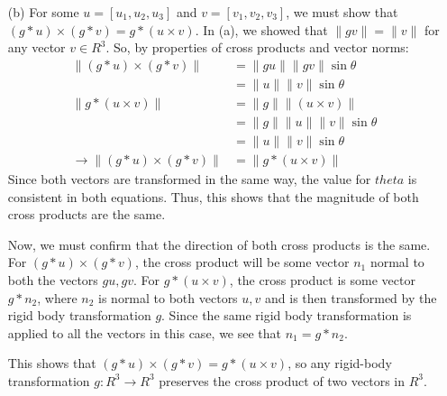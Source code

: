 \documentclass[12pt]{article}
\begin{document}
\begin{enumerate}
	\item[(b)] For some  $u = [u_1, u_2, u_3]$ and $v = [v_1, v_2, v_3]$, we must show that $(g * u) \times (g * v) = g * (u \times v)$. In (a), we showed that $\|gv\| = \|v\|$ for any vector $v \in R^3$. So, by properties of cross products and vector norms:
	\begin{align*}
	\| (g * u) \times (g * v) \| &= \|gu\| \|gv\| \sin\theta \\
	&= \|u\| \|v\| \sin\theta \\
	\|g * (u \times v)\| &= \|g \| \|(u \times v)\| \\
	&= \|g \| \|u\| \|v\| \sin\theta \\
	&= \|u\| \|v\| \sin\theta \\
	\rightarrow \| (g * u) \times (g * v) \| &= \|g * (u \times v)\|
	\end{align*}
	Since both vectors are transformed in the same way, the value for $theta$ is consistent in both equations. Thus, this shows that the magnitude of both cross products are the same. 
	
	Now, we must confirm that the direction of both cross products is the same. For $(g * u) \times (g * v)$, the cross product will be some vector $n_1$ normal to both the vectors $gu, gv$. For $g * (u \times v)$, the cross product is some vector $g * n_2$, where $n_2$ is normal to both vectors $u, v$ and is then transformed by the rigid body transformation $g$. Since the same rigid body transformation is applied to all the vectors in this case, we see that $n_1 = g * n_2$. 
	
	This shows that $(g * u) \times (g * v) = g * (u \times v)$, so any rigid-body transformation $g: R^3 \rightarrow R^3$ preserves the cross product of two vectors in $R^3$.


\end{enumerate}
\end{document}
